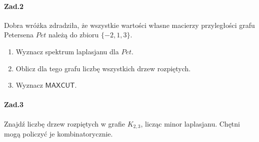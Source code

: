 \documentclass[a4paper,12pt]{article}
\theoremstyle{definition}%
\theoremstyle{definition}
\theoremstyle{problem}
\begin{document}
\paragraph{Zad.2} Dobra wróżka zdradziła, że wszystkie wartości własne macierzy przyległości grafu Petersena $Pet$ należą do zbioru $\{-2, 1, 3\}$.
\begin{enumerate}[label=\alph*)]
\item Wyznacz spektrum laplasjanu dla $Pet$.
\item Oblicz dla tego grafu liczbę wszystkich drzew rozpiętych.
\item Wyznacz $\mathsf{MAXCUT}$.
\end{enumerate}

\paragraph{Zad.3} Znajdź liczbę drzew rozpiętych w grafie $K_{2,3}$, licząc minor laplasjanu. Chętni mogą policzyć je kombinatorycznie.
\end{document}
